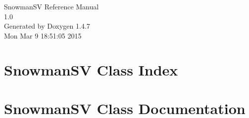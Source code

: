 \documentclass[a4paper]{book}
\begin{document}
\begin{titlepage}
\vspace*{7cm}
\begin{center}
{\Large Snowman\-SV Reference Manual\\[1ex]\large 1.0 }\\
\vspace*{1cm}
{\large Generated by Doxygen 1.4.7}\\
\vspace*{0.5cm}
{\small Mon Mar 9 18:51:05 2015}\\
\end{center}
\end{titlepage}
\clearemptydoublepage
{}
\tableofcontents
\clearemptydoublepage
{}
\chapter{Snowman\-SV Class Index}

\chapter{Snowman\-SV Class Documentation}







\printindex
\end{document}
